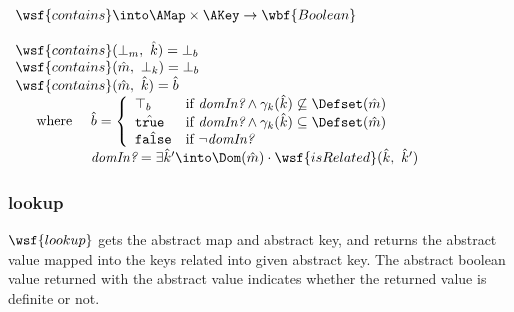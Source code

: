 $\begin{array}{l}
\wsf{contains} \into \AMap \times \AKey \rightarrow \wbf{Boolean} \\\\
\wsf{contains}(\bot_m,\ \hat{k}) = \bot_b \\
\wsf{contains}(\hat{m},\ \bot_k) = \bot_b \\
\wsf{contains}(\hat{m},\ \hat{k}) = \hat{b} \\
\quad \begin{array}{ll} \textrm{where }
& \hat{b} = \left \{ \begin{array}{ll}
\top_b & \textrm{if } \emph{domIn?} \land \gamma_k(\hat{k}) \not\subseteq \Defset(\hat{m}) \\
\hat{\texttt{true}} & \textrm{if } \emph{domIn?} \land \gamma_k(\hat{k}) \subseteq \Defset(\hat{m}) \\
\hat{\texttt{false}} & \textrm{if } \neg \emph{domIn?} \\
\end{array} \right.\\
& \emph{domIn?} = \exists \hat{k}' \into \Dom(\hat{m}) \cdot
\wsf{isRelated}(\hat{k},\ \hat{k}')\\
\end{array}\\
\end{array}$

\subsubsection{lookup}
$\wsf{lookup}$ gets the abstract map and abstract key,
and returns the abstract value mapped into the keys related into given abstract key.
The abstract boolean value returned with the abstract value indicates
whether the returned value is definite or not.\\


